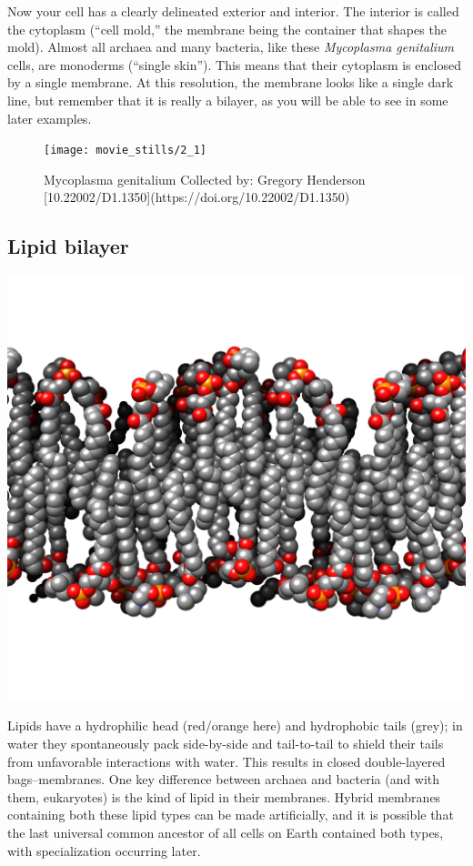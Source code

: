 \documentclass[]{tufte-book}
\begin{document}
Now your cell has a clearly delineated exterior and interior. The
interior is called the cytoplasm (``cell mold,'' the membrane being the
container that shapes the mold). Almost all archaea and many bacteria,
like these \emph{Mycoplasma genitalium} cells, are monoderms (``single
skin''). This means that their cytoplasm is enclosed by a single
membrane. At this resolution, the membrane looks like a single dark
line, but remember that it is really a bilayer, as you will be able to
see in some later examples.

\begin{figure}
\texttt{[image: movie\_stills/2\_1]} \caption[Mycoplasma genitalium Collected by]{Mycoplasma genitalium Collected by: Gregory Henderson [10.22002/D1.1350](https://doi.org/10.22002/D1.1350)}\label{fig:unnamed-chunk-17}
\end{figure}

\subsection{Lipid bilayer}\label{Lipid_bilayer}

\includegraphics{img/schematics/2_1_1}

Lipids have a hydrophilic head (red/orange here) and hydrophobic tails
(grey); in water they spontaneously pack side-by-side and tail-to-tail
to shield their tails from unfavorable interactions with water. This
results in closed double-layered bags--membranes. One key difference
between archaea and bacteria (and with them, eukaryotes) is the kind of
lipid in their membranes. Hybrid membranes containing both these lipid
types can be made artificially, and it is possible that the last
universal common ancestor of all cells on Earth contained both types,
with specialization occurring later.
\end{document}

